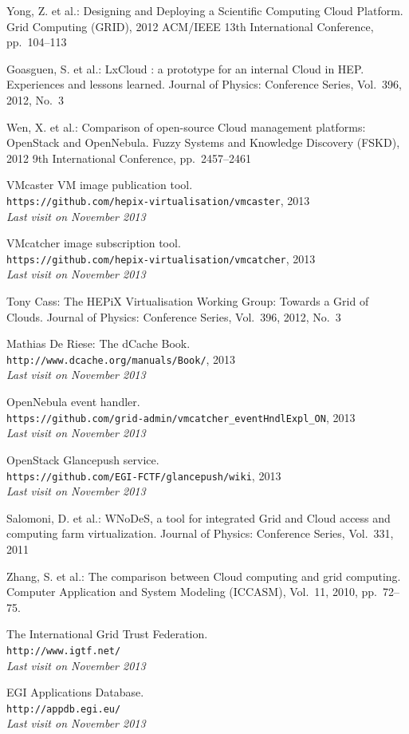 \documentclass{cai}
\begin{document}
\begin{thebibliography}{99}
Yong, Z. et al.: Designing and Deploying a Scientific Computing Cloud Platform.
Grid Computing (GRID), 2012 ACM/IEEE 13th International Conference, pp.~104--113

Goasguen, S. et al.: LxCloud : a prototype for an internal Cloud in HEP. Experiences and lessons learned.
Journal of Physics: Conference Series,
Vol.~396, 2012, No.~3

Wen, X. et al.: Comparison of open-source Cloud management platforms: OpenStack and OpenNebula.
Fuzzy Systems and Knowledge Discovery (FSKD), 2012 9th International Conference, pp.~2457--2461


VMcaster VM image publication tool. \\
\texttt{https://github.com/hepix-virtualisation/vmcaster}, 2013 \\
\textit{Last visit on November 2013}

VMcatcher image subscription tool. \\
\texttt{https://github.com/hepix-virtualisation/vmcatcher}, 2013 \\
\textit{Last visit on November 2013}

Tony Cass: The HEPiX Virtualisation Working Group: Towards a Grid of Clouds.
Journal of Physics: Conference Series,
Vol.~396, 2012, No.~3

Mathias De Riese: The dCache Book. \\
\texttt{http://www.dcache.org/manuals/Book/}, 2013 \\
\textit{Last visit on November 2013}

OpenNebula event handler. \\
\texttt{https://github.com/grid-admin/vmcatcher\_eventHndlExpl\_ON}, 2013 \\
\textit{Last visit on November 2013}

OpenStack Glancepush service. \\
\texttt{https://github.com/EGI-FCTF/glancepush/wiki}, 2013 \\
\textit{Last visit on November 2013}

Salomoni, D. et al.: WNoDeS, a tool for integrated Grid and Cloud access and computing farm virtualization.
Journal of Physics: Conference Series,
Vol.~331, 2011

Zhang, S. et al.: The comparison between Cloud computing and grid computing.
Computer Application and System Modeling (ICCASM),
Vol.~11, 2010, pp.~72--75.

The International Grid Trust Federation. \\
\texttt{http://www.igtf.net/}\\
\textit{Last visit on November 2013}

EGI Applications Database. \\
\texttt{http://appdb.egi.eu/} \\
\textit{Last visit on November 2013}

\end{thebibliography}
\end{document}
